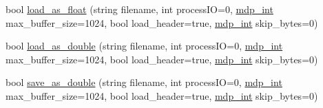 \begin{DoxyCompactItemize}
\item 
bool \hyperlink{classmdp__complex__field_a41ca79e9686143c660588426dc71dd0b}{load\_\-as\_\-float} (string filename, int processIO=0, \hyperlink{mdp__global__vars_8h_aaa1ad9d0dcd2124aa5af0120d9954174}{mdp\_\-int} max\_\-buffer\_\-size=1024, bool load\_\-header=true, \hyperlink{mdp__global__vars_8h_aaa1ad9d0dcd2124aa5af0120d9954174}{mdp\_\-int} skip\_\-bytes=0)
\item 
bool \hyperlink{classmdp__complex__field_ae7c4fe41d81ce71b9d1527b15916391f}{load\_\-as\_\-double} (string filename, int processIO=0, \hyperlink{mdp__global__vars_8h_aaa1ad9d0dcd2124aa5af0120d9954174}{mdp\_\-int} max\_\-buffer\_\-size=1024, bool load\_\-header=true, \hyperlink{mdp__global__vars_8h_aaa1ad9d0dcd2124aa5af0120d9954174}{mdp\_\-int} skip\_\-bytes=0)
\item 
bool \hyperlink{classmdp__complex__field_aa6357291a82fe4209f7b3a7ecce3ca78}{save\_\-as\_\-double} (string filename, int processIO=0, \hyperlink{mdp__global__vars_8h_aaa1ad9d0dcd2124aa5af0120d9954174}{mdp\_\-int} max\_\-buffer\_\-size=1024, bool load\_\-header=true, \hyperlink{mdp__global__vars_8h_aaa1ad9d0dcd2124aa5af0120d9954174}{mdp\_\-int} skip\_\-bytes=0)
\end{DoxyCompactItemize}
